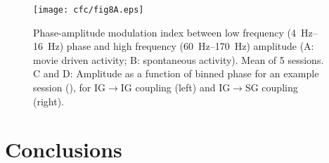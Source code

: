\begin{figure}[htbp]
\centering \texttt{[image: cfc/fig8A.eps]}
%
\caption{
Phase-amplitude modulation index between low frequency (\SIrange{4}{16}{Hz}) phase and high frequency (\SIrange{60}{170}{Hz}) amplitude (A: movie driven activity; B: spontaneous activity).
Mean of \num{5} sessions.
C and D: Amplitude as a function of binned phase for an example session (), for \ac{IG}$\rightarrow$\ac{IG} coupling (left) and \ac{IG}$\rightarrow$\ac{SG} coupling (right).}%
\label{fig:lam_8}
%
\end{figure}


\section{Conclusions}
